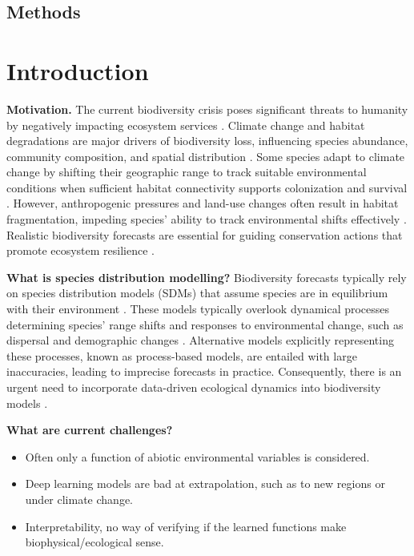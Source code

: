 \subsection{Methods}




\section{Introduction}
\noindent\textbf{Motivation.}
The current biodiversity crisis poses significant threats to humanity by negatively impacting ecosystem services \cite{Barnosky2011,ipbes2019}. Climate change and habitat degradations are major drivers of biodiversity loss, influencing species abundance, community composition, and spatial distribution \cite{ipbes2019, pereira2010}. Some species adapt to climate change by shifting their geographic range to track suitable environmental conditions \cite{bellard2012} when sufficient habitat connectivity supports colonization and survival \cite{hodgson2016}. However, anthropogenic pressures and land-use changes often result in habitat fragmentation, impeding species' ability to track environmental shifts effectively \cite{mcguire2016}. Realistic biodiversity forecasts are essential for guiding conservation actions that promote ecosystem resilience \cite{urban2015}. 

\noindent\textbf{What is species distribution modelling?}
Biodiversity forecasts typically rely on species distribution models (SDMs) that assume species are in equilibrium with their environment \cite{guisan2000}. These models typically overlook dynamical processes determining species’ range shifts and responses to environmental change, such as dispersal and demographic changes \cite{svenning2013}. Alternative models explicitly representing these processes, known as process-based models, are entailed with large inaccuracies, leading to imprecise forecasts in practice. Consequently, there is an urgent need to incorporate data-driven ecological dynamics into biodiversity models \cite{urban2015}. 

\noindent\textbf{What are current challenges?}
\begin{itemize}
    \item Often only a function of abiotic environmental variables is considered.  
    \item Deep learning models are bad at extrapolation, such as to new regions or under climate change.
    \item Interpretability, no way of verifying if the learned functions make biophysical/ecological sense.
\end{itemize}

